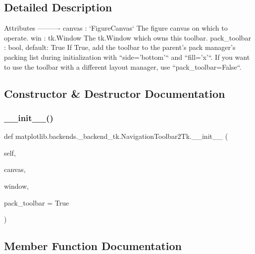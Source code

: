 \subsection{Detailed Description}
\begin{DoxyVerb}Attributes
----------
canvas : `FigureCanvas`
    The figure canvas on which to operate.
win : tk.Window
    The tk.Window which owns this toolbar.
pack_toolbar : bool, default: True
    If True, add the toolbar to the parent's pack manager's packing list
    during initialization with ``side='bottom'`` and ``fill='x'``.
    If you want to use the toolbar with a different layout manager, use
    ``pack_toolbar=False``.
\end{DoxyVerb}
 

\subsection{Constructor \& Destructor Documentation}
\mbox{\label{classmatplotlib_1_1backends_1_1__backend__tk_1_1NavigationToolbar2Tk_a7afa94dcd10e7282faa36d3e1d35f735}} 
\subsubsection{\texorpdfstring{\+\_\+\+\_\+init\+\_\+\+\_\+()}{\_\_init\_\_()}}
{\footnotesize\ttfamily def matplotlib.\+backends.\+\_\+backend\+\_\+tk.\+Navigation\+Toolbar2\+Tk.\+\_\+\+\_\+init\+\_\+\+\_\+ (\begin{DoxyParamCaption}\item[{}]{self,  }\item[{}]{canvas,  }\item[{}]{window,  }\item[{}]{pack\+\_\+toolbar = {\ttfamily True} }\end{DoxyParamCaption})}



\subsection{Member Function Documentation}
\mbox{\label{classmatplotlib_1_1backends_1_1__backend__tk_1_1NavigationToolbar2Tk_a54be92f7ac024ea9da10e49b8eee6529}} 
